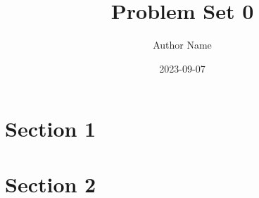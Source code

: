 \documentclass{article}
\title{Problem Set 0}
\author{Author Name}
\date{2023-09-07}
\begin{document}
\maketitle

\section{Section 1}

\section{Section 2}
\end{document}
